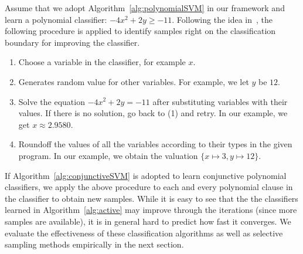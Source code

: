 Assume that we adopt Algorithm~\ref{alg:polynomialSVM} in our framework and learn a polynomial classifier: $-4x^2+2y \geq -11$. Following the idea in~\cite{DBLP:conf/icml/OrabonaC11}, the following procedure is applied to identify samples right on the classification boundary for improving the classifier.
\begin{enumerate}
\item Choose a variable in the classifier, for example $x$.
\item Generates random value for other variables. For example, we let $y$ be $12$.
\item Solve the equation $-4x^2+2y = -11$ after substituting variables with their values. If there is no solution, go back to (1) and retry. In our example, we get $x \approx 2.9580$.
\item Roundoff the values of all the variables according to their types in the given program. In our example, we obtain the valuation $\{x \mapsto 3, y \mapsto 12\}$.
\end{enumerate}
If Algorithm~\ref{alg:conjunctiveSVM} is adopted to learn conjunctive polynomial classifiers, we apply the above procedure to each and every polynomial clause in the classifier to obtain new samples. While it is easy to see that the the classifiers learned in Algorithm~\ref{alg:active} may improve through the iterations (since more samples are available), it is in general hard to predict how fast it converges. We evaluate the effectiveness of these classification algorithms as well as selective sampling methods empirically in the next section.
%
%
%

